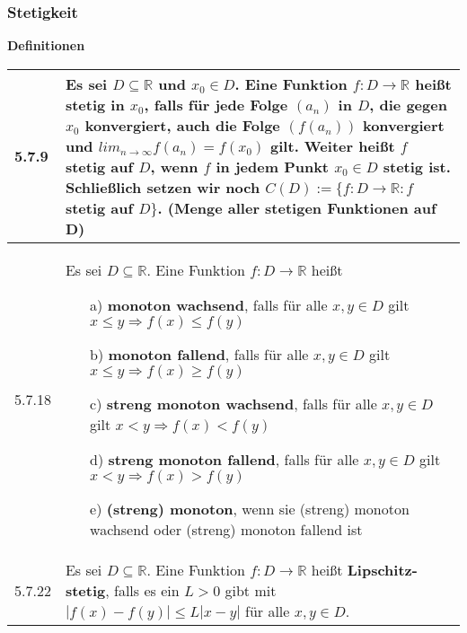 \subsubsection{Stetigkeit}
    \noindent
    \textbf{Definitionen}
    \begin{table}[H]  
    \begin{tabularx}{\textwidth}{X m{16cm}}
        \toprule

        5.7.9 & Es sei $D \subseteq \mathbb{R}$ und $x_0 \in D$. Eine Funktion $f : D \rightarrow \mathbb{R}$ heißt
                \textbf{stetig} in $x_0$, falls für jede Folge $(a_n)$ in $D$, die gegen $x_0$ konvergiert, auch die Folge $(f(a_n))$ 
                konvergiert und $lim_{n \rightarrow \infty} f(a_n) = f(x_0)$ gilt. \hfill \break 
                Weiter heißt $f$ stetig auf $D$, wenn $f$ in jedem Punkt $x_0 \in D$ stetig ist. \hfill \break
                Schließlich setzen wir noch $C(D) := \{f:D \rightarrow \mathbb{R}: f$ stetig auf $D\}$. 
                (Menge aller stetigen Funktionen auf D) \\
        \midrule
        5.7.18& Es sei $D \subseteq \mathbb{R}$. Eine Funktion $f: D \rightarrow \mathbb{R}$ heißt
                \begin{itemize}[topsep=-0.5cm]
                    \item[a)] \textbf{monoton wachsend}, falls für alle $x,y \in D$ gilt $x \leq y \Rightarrow f(x) \leq f(y)$
                    \item[b)] \textbf{monoton fallend}, falls für alle $x,y \in D$ gilt $x \leq y \Rightarrow f(x) \geq f(y)$
                    \item[c)] \textbf{streng monoton wachsend}, falls für alle $x,y \in D$ gilt $x < y \Rightarrow f(x) < f(y)$
                    \item[d)] \textbf{streng monoton fallend}, falls für alle $x,y \in D$ gilt $x < y \Rightarrow f(x) > f(y)$
                    \item[e)] \textbf{(streng) monoton}, wenn sie (streng) monoton wachsend oder (streng) monoton fallend ist 
                \end{itemize} \vspace{-0cm} \\
        \midrule
        5.7.22& Es sei $D \subseteq \mathbb{R}$. Eine Funktion $f : D \rightarrow \mathbb{R}$ heißt \textbf{Lipschitz-stetig}, falls
                es ein $L > 0$ gibt mit $|f(x) - f(y)| \leq L|x-y|$ für alle $x,y \in D$. \\

        \bottomrule

    \end{tabularx}
    \end{table}

